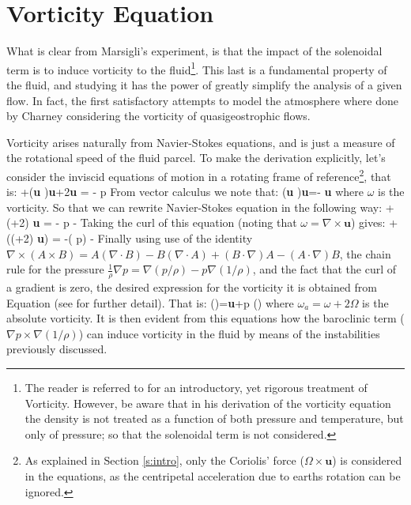 \section{Vorticity Equation}
\label{s:vorticity}

What is clear from Marsigli's experiment, is that the impact of the
solenoidal term is to induce vorticity to the fluid\footnote{The reader
is referred to  for an introductory, yet rigorous
treatment of Vorticity. However, be aware that in his derivation of the
vorticity equation the density is not treated as a function of both
pressure and temperature, but only of pressure; so that the solenoidal
term is not considered.}. This last is a fundamental property of the
fluid, and studying it has the power of greatly simplify the analysis of a
given flow. In fact, the first satisfactory attempts to model the atmosphere
where done by Charney considering the vorticity of quasigeostrophic flows.

Vorticity arises naturally from Navier-Stokes equations, and is just
a measure of the rotational speed of the fluid parcel. To make the
derivation explicitly, let's consider the inviscid equations of motion in
a rotating frame of reference\footnote{As explained in Section
\ref{s:intro}, only the Coriolis' force ($\Omega \times \textbf{u}$) is
considered in the equations, as the centripetal acceleration due to
earths rotation can be ignored.}, that is:
\beq
{}+(\textbf{u} \cdot \nabla)\textbf{u}+2\Omega \times \textbf{u} = - \nabla p
From vector calculus we note that:
\beq
(\textbf{u} \cdot \nabla)\textbf{u}=- \textbf{u} \times \omega
{}
where $\omega$ is the vorticity. So that we can rewrite Navier-Stokes equation in the following way:
\beq
{}+(\omega+2\Omega) \times \textbf{u} = - \nabla p -
Taking the curl of this equation (noting that $\omega = \nabla \times
\textbf{u}$) gives:
\beq
{}+\nabla \times ((\omega+2\Omega) \times \textbf{u}) = -\nabla \times\left( \nabla p\right) -\nabla \times {}
Finally using use of the identity $\nabla \times (A \times B) = A (\nabla
\cdot B)-B (\nabla \cdot A)+(B \cdot \nabla)A-(A \cdot \nabla)B$, the
chain rule for the pressure $\frac{1}{\rho} \nabla p = \nabla (p/\rho)-p
\nabla (1/\rho)$, and the fact that the curl of a gradient is zero, the desired expression for the vorticity it is obtained from Equation  (see  for further detail). That is:
\beq
{}\left(\right)= \textbf{u}+\nabla p \times \nabla \left(\right)
where $\omega_a=\omega+2\Omega$ is the absolute vorticity. It is then
evident from this equations how the baroclinic term ($\nabla p \times \nabla (1/\rho)$) can induce vorticity in the fluid by means of the instabilities previously discussed.

